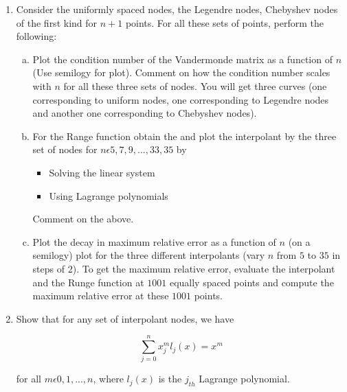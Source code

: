\documentclass{article}
\begin{document}
\begin{enumerate}
\item Consider the uniformly spaced nodes, the Legendre nodes, Chebyshev nodes of the first kind for $n+1$ points. For all these sets of points, perform the following:

\begin{enumerate}[(a)]
\item Plot the condition number of the Vandermonde matrix as a function of $n$ (Use semilogy for plot). Comment on how the condition number scales with $n$ for all these three sets of nodes. You will get three curves (one corresponding to uniform nodes, one corresponding to Legendre nodes and another one corresponding to Chebyshev nodes).
\item For the Range function obtain the and plot the interpolant by the three set of nodes for $n \epsilon {5, 7, 9, ..., 33, 35}$ by

\begin{itemize}
\item Solving the linear system
\item Using Lagrange polynomials
\end{itemize}

Comment on the above.

\item Plot the decay in maximum relative error as a function of $n$ (on a semilogy) plot for the three different interpolants (vary $n$ from $5$ to $35$ in steps of $2$). To get the maximum relative error, evaluate the interpolant and the Runge function at $1001$ equally spaced points and compute the maximum relative error at these $1001$ points.

\end{enumerate}

\item Show that for any set of interpolant nodes, we have

    $$\displaystyle \sum_{j=0}^{n} x_{j}^{m} l_{j}(x) = x^{m} $$

for all $m \epsilon {0, 1, ..., n}$, where $l_{j}(x)$ is the $j_{th}$ Lagrange polynomial.
\end{enumerate}
\end{document}
